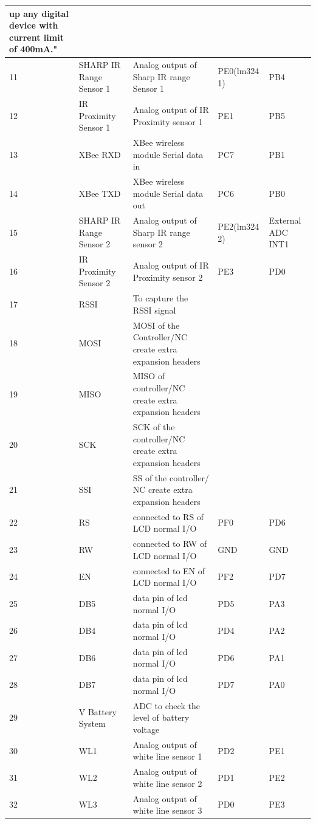 \documentclass[a4paper,10pt,oneside]{article}
\begin{document}
{\begin{longtable}{|p{}|p{}|p{}|p{}|p{}|}
				up any digital device with current limit of
				400mA."	& &\\ \hline
				11&	SHARP IR Range Sensor 1	&Analog output of Sharp IR range Sensor 1&	PE0(lm324 1) & PB4\\ \hline
				12&	IR Proximity Sensor 1&	Analog output of IR Proximity sensor 1&	PE1 & PB5\\ \hline
				13&	XBee RXD&	XBee wireless module Serial data in	&PC7 & PB1\\ \hline
				14&	XBee TXD&	XBee wireless module Serial data out&	PC6 & PB0\\ \hline
				15&	SHARP IR Range Sensor 2	& Analog output of Sharp IR range sensor 2&	PE2(lm324 2) & External ADC INT1\\ \hline
				16&	IR Proximity Sensor 2&	Analog output of IR Proximity sensor 2&	PE3 & PD0\\ \hline
				17&	RSSI&	To capture the RSSI signal& &\\ \hline	
				18&	MOSI&	MOSI of the Controller/NC create extra expansion headers& &\\ \hline	
				19&	MISO&	MISO of controller/NC create extra expansion headers & &\\ \hline
				20&	SCK&	SCK of the controller/NC create extra expansion headers&&	\\ \hline
				21&	SSI	&SS of the controller/ NC create extra expansion headers	&&\\ \hline
				22&	RS&	connected to RS of LCD normal I/O&	PF0 & PD6\\ \hline
				23&	RW&	connected to RW of LCD normal I/O&	GND & GND\\ \hline
				24&	EN&	connected to EN of LCD normal I/O&	PF2 & PD7\\ \hline
				25&	DB5	&data pin of lcd normal I/O	&PD5 & PA3\\ \hline
				26&	DB4&	data pin of lcd normal I/O&	PD4 & PA2\\ \hline
				27&	DB6	&data pin of lcd normal I/O	&PD6 & PA1\\ \hline
				28&	DB7	&data pin of lcd normal I/O	&PD7 & PA0\\ \hline
				29&	V Battery System&	ADC to check the level of battery voltage &	&\\ \hline
				30&	WL1&	Analog output of white line sensor 1	&PD2 & PE1\\ \hline
				31&	WL2&	Analog output of white line sensor 2&	PD1 & PE2\\ \hline
				32&	WL3&	Analog output of white line sensor 3&	PD0 & PE3\\ \hline

\end{longtable}}
\end{document}
